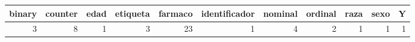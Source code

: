 
\begin{tabular}{r|r|r|r|r|r|r|r|r|r|r}
\hline
binary & counter & edad & etiqueta & farmaco & identificador & nominal & ordinal & raza & sexo & Y\\
\hline
3 & 8 & 1 & 3 & 23 & 1 & 4 & 2 & 1 & 1 & 1\\
\hline
\end{tabular}

